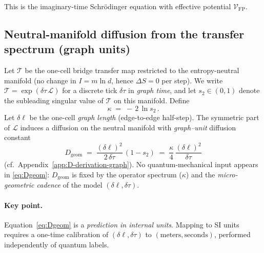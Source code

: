 \documentclass[11pt]{article}
\theoremstyle{plain}
\theoremstyle{definition}
\begin{document}
This is the imaginary-time Schrödinger equation with effective potential $\mathcal{V}_{\mathrm{FP}}$.


\subsection{Neutral-manifold diffusion from the transfer spectrum (graph units)}\label{subsec:neutral-diffusion-graph}

Let $\mathcal T$ be the one-cell bridge transfer map restricted to the entropy-neutral manifold
(no change in $I=m\ln d$, hence $\Delta S=0$ per step).
We write $\mathcal T = \exp(\delta \tau\,\mathcal L)$ for a discrete tick $\delta \tau$ in \emph{graph time},
and let $s_2\in(0,1)$ denote the subleading singular value of $\mathcal T$ on this manifold.
Define
\begin{equation}\label{eq:kappa-def-graph}
  \kappa \;=\; -\,2\,\ln s_2 \, .
\end{equation}
Let $\delta \ell$ be the one-cell \emph{graph length} (edge-to-edge half-step). The symmetric part of $\mathcal L$
induces a diffusion on the neutral manifold with \emph{graph–unit} diffusion constant
\begin{equation}\label{eq:Dgeom}
  \boxed{\quad D_{\mathrm{geom}} \;=\; \frac{(\delta\ell)^2}{2\,\delta\tau}\,(1-s_2)
  \;=\; \frac{\kappa}{4}\,\frac{(\delta\ell)^2}{\delta\tau}\quad}
\end{equation}
(cf.\ Appendix~\ref{app:D-derivation-graph}).  No quantum-mechanical input appears in \eqref{eq:Dgeom}:
$D_{\mathrm{geom}}$ is fixed by the operator spectrum ($\kappa$) and the \emph{micro-geometric cadence} of the model
$(\delta\ell,\delta\tau)$.

\paragraph{Key point.}
Equation~\eqref{eq:Dgeom} is a \emph{prediction in internal units}.  Mapping to SI units requires a one-time
calibration of $(\delta\ell,\delta\tau)$ to $(\mathrm{meters},\mathrm{seconds})$, performed independently of quantum labels.
\end{document}
